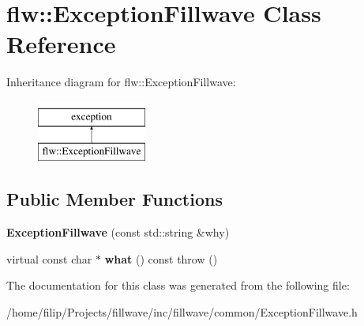 \hypertarget{classflw_1_1ExceptionFillwave}{}\section{flw\+:\+:Exception\+Fillwave Class Reference}
\label{classflw_1_1ExceptionFillwave}
Inheritance diagram for flw\+:\+:Exception\+Fillwave\+:\begin{figure}[H]
\begin{center}
\leavevmode
\includegraphics[height=2.000000cm]{classflw_1_1ExceptionFillwave}
\end{center}
\end{figure}
\subsection*{Public Member Functions}
\begin{DoxyCompactItemize}
\item 
{\bfseries Exception\+Fillwave} (const std\+::string \&why)\hypertarget{classflw_1_1ExceptionFillwave_aedf692283fdf780d0683aad1a9eb9b2f}{}\label{classflw_1_1ExceptionFillwave_aedf692283fdf780d0683aad1a9eb9b2f}

\item 
virtual const char $\ast$ {\bfseries what} () const   throw ()\hypertarget{classflw_1_1ExceptionFillwave_a2d7acf0b3c3b540c84b8c5aff1328330}{}\label{classflw_1_1ExceptionFillwave_a2d7acf0b3c3b540c84b8c5aff1328330}

\end{DoxyCompactItemize}


The documentation for this class was generated from the following file\+:\begin{DoxyCompactItemize}
\item 
/home/filip/\+Projects/fillwave/inc/fillwave/common/Exception\+Fillwave.\+h\end{DoxyCompactItemize}
